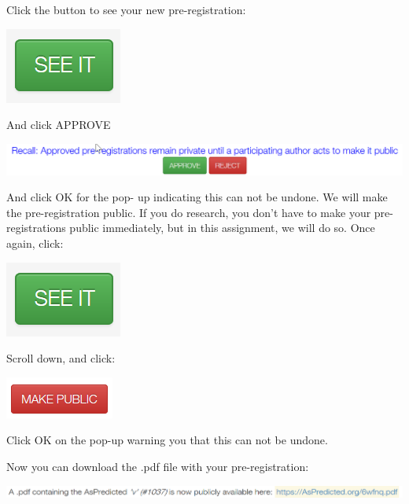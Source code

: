 \documentclass[
  oneside]{book}
\begin{document}
Click the button to see your new pre-registration:

\begin{center}\includegraphics[width=0.2\linewidth]{images/5623f5d1b8144f8cdc09d955eaf4a3b7} \end{center}

And click APPROVE

\begin{center}\includegraphics[width=1\linewidth]{images/6c3b919ae37f5dfed14761209592f337} \end{center}

And click OK for the pop- up indicating this can not be undone. We will make the
pre-registration public. If you do research, you don't have to make your
pre-registrations public immediately, but in this assignment, we will do so.
Once again, click:

\begin{center}\includegraphics[width=0.2\linewidth]{images/5623f5d1b8144f8cdc09d955eaf4a3b7} \end{center}

Scroll down, and click:

\begin{center}\includegraphics[width=0.2\linewidth]{images/94a843f900ec4dcbb75f60686edac510} \end{center}

Click OK on the pop-up warning you that this can not be undone.

Now you can download the .pdf file with your pre-registration:

\begin{center}\includegraphics[width=1\linewidth]{images/87e9befad90809fbccf7be6898f5d183} \end{center}
\end{document}
